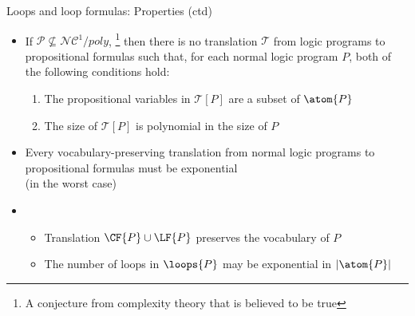\begin{frame}{Loops and loop formulas: Properties (ctd)}
\bigskip
\begin{itemize}
\item {}
  If ${\mathcal{P}} \not\subseteq {\mathcal{NC}}^1\!/\mathit{poly}$,%
  \footnote{A conjecture from complexity theory that is believed to be true}
  then there is no translation $\mathcal{T}$
  from logic programs to propositional formulas
  such that, for each normal logic program $P$,
  both of the following conditions hold:
  \begin{enumerate}
  \item The propositional variables in $\mathcal{T}[P]$ are a subset of $\atom{P}$
  \item The size of $\mathcal{T}[P]$ is polynomial in the size of $P$
\end{enumerate}
\medskip
\item<2->  Every vocabulary-preserving translation from normal logic programs to
  propositional formulas must be exponential\\
  (in the worst case)
\medskip
\item<3->
  \begin{itemize}
  \item Translation $\CF{P}\cup\LF{P}$ preserves the vocabulary of $P$
  \item The number of loops in $\loops{P}$ may be exponential in $|\atom{P}|$
  \end{itemize}
\end{itemize}
\end{frame}

